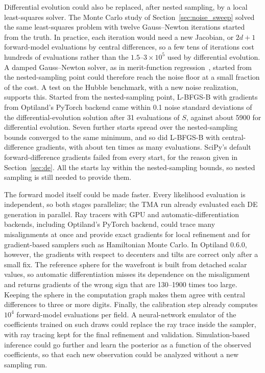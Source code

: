 Differential evolution could also be replaced, after nested sampling, by a local least-squares solver. The Monte Carlo study of Section~\ref{sec:noise_sweep} solved the same least-squares problem with twelve Gauss--Newton iterations started from the truth. In practice, each iteration would need a new Jacobian, or $2d+1$ forward-model evaluations by central differences, so a few tens of iterations cost hundreds of evaluations rather than the $1.5$--$3\times10^5$ used by differential evolution. A damped Gauss--Newton solver, as in merit-function regression~\citep{Kim2007}, started from the nested-sampling point could therefore reach the noise floor at a small fraction of the cost. A test on the Hubble benchmark, with a new noise realization, supports this. Started from the nested-sampling point, L-BFGS-B with gradients from Optiland's PyTorch backend came within 0.1 noise standard deviations of the differential-evolution solution after 31 evaluations of $S$, against about 5900 for differential evolution. Seven further starts spread over the nested-sampling bounds converged to the same minimum, and so did L-BFGS-B with central-difference gradients, with about ten times as many evaluations. SciPy's default forward-difference gradients failed from every start, for the reason given in Section~\ref{sec:de}. All the starts lay within the nested-sampling bounds, so nested sampling is still needed to provide them.

The forward model itself could be made faster. Every likelihood evaluation is independent, so both stages parallelize; the TMA run already evaluated each DE generation in parallel. Ray tracers with GPU and automatic-differentiation backends, including Optiland's PyTorch backend, could trace many misalignments at once and provide exact gradients for local refinement and for gradient-based samplers such as Hamiltonian Monte Carlo. In Optiland 0.6.0, however, the gradients with respect to decenters and tilts are correct only after a small fix. The reference sphere for the wavefront is built from detached scalar values, so automatic differentiation misses its dependence on the misalignment and returns gradients of the wrong sign that are 130--1900 times too large. Keeping the sphere in the computation graph makes them agree with central differences to three or more digits. Finally, the calibration step already computes $10^4$ forward-model evaluations per field. A neural-network emulator of the coefficients trained on such draws could replace the ray trace inside the sampler, with ray tracing kept for the final refinement and validation. Simulation-based inference could go further and learn the posterior as a function of the observed coefficients, so that each new observation could be analyzed without a new sampling run.

